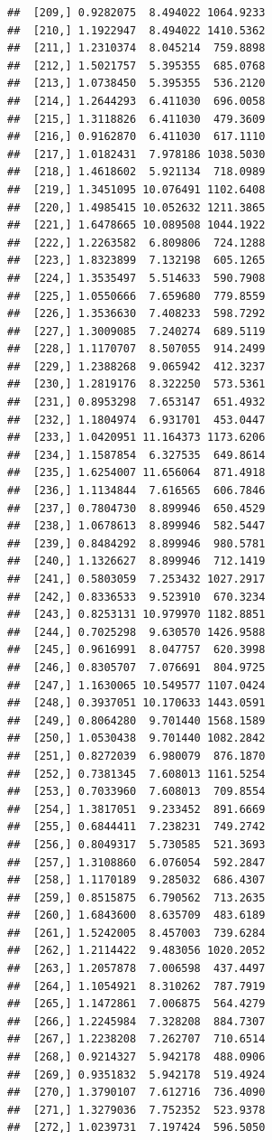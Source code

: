 \documentclass[article]{jss}\usepackage[]{graphicx}\usepackage[]{xcolor}
\makeatletter
\newenvironment{kframe}{%
 \def\at@end@of@kframe{}%
 \ifinner\ifhmode%
  \def\at@end@of@kframe{\end{minipage}}%
  \begin{minipage}{\columnwidth}%
 \fi\fi%
 \def\FrameCommand##1{\hskip\@totalleftmargin \hskip-\fboxsep
 \colorbox{shadecolor}{##1}\hskip-\fboxsep
     \hskip-\linewidth \hskip-\@totalleftmargin \hskip\columnwidth}%
 \MakeFramed {\advance\hsize-\width
   \@totalleftmargin\z@ \linewidth\hsize
   \@setminipage}}%
 {\par\unskip\endMakeFramed%
 \at@end@of@kframe}
\newenvironment{knitrout}{}{} %
\makeatother
\begin{document}
\begin{knitrout}
\begin{kframe}
\begin{verbatim}
##  [209,] 0.9282075  8.494022 1064.9233
##  [210,] 1.1922947  8.494022 1410.5362
##  [211,] 1.2310374  8.045214  759.8898
##  [212,] 1.5021757  5.395355  685.0768
##  [213,] 1.0738450  5.395355  536.2120
##  [214,] 1.2644293  6.411030  696.0058
##  [215,] 1.3118826  6.411030  479.3609
##  [216,] 0.9162870  6.411030  617.1110
##  [217,] 1.0182431  7.978186 1038.5030
##  [218,] 1.4618602  5.921134  718.0989
##  [219,] 1.3451095 10.076491 1102.6408
##  [220,] 1.4985415 10.052632 1211.3865
##  [221,] 1.6478665 10.089508 1044.1922
##  [222,] 1.2263582  6.809806  724.1288
##  [223,] 1.8323899  7.132198  605.1265
##  [224,] 1.3535497  5.514633  590.7908
##  [225,] 1.0550666  7.659680  779.8559
##  [226,] 1.3536630  7.408233  598.7292
##  [227,] 1.3009085  7.240274  689.5119
##  [228,] 1.1170707  8.507055  914.2499
##  [229,] 1.2388268  9.065942  412.3237
##  [230,] 1.2819176  8.322250  573.5361
##  [231,] 0.8953298  7.653147  651.4932
##  [232,] 1.1804974  6.931701  453.0447
##  [233,] 1.0420951 11.164373 1173.6206
##  [234,] 1.1587854  6.327535  649.8614
##  [235,] 1.6254007 11.656064  871.4918
##  [236,] 1.1134844  7.616565  606.7846
##  [237,] 0.7804730  8.899946  650.4529
##  [238,] 1.0678613  8.899946  582.5447
##  [239,] 0.8484292  8.899946  980.5781
##  [240,] 1.1326627  8.899946  712.1419
##  [241,] 0.5803059  7.253432 1027.2917
##  [242,] 0.8336533  9.523910  670.3234
##  [243,] 0.8253131 10.979970 1182.8851
##  [244,] 0.7025298  9.630570 1426.9588
##  [245,] 0.9616991  8.047757  620.3998
##  [246,] 0.8305707  7.076691  804.9725
##  [247,] 1.1630065 10.549577 1107.0424
##  [248,] 0.3937051 10.170633 1443.0591
##  [249,] 0.8064280  9.701440 1568.1589
##  [250,] 1.0530438  9.701440 1082.2842
##  [251,] 0.8272039  6.980079  876.1870
##  [252,] 0.7381345  7.608013 1161.5254
##  [253,] 0.7033960  7.608013  709.8554
##  [254,] 1.3817051  9.233452  891.6669
##  [255,] 0.6844411  7.238231  749.2742
##  [256,] 0.8049317  5.730585  521.3693
##  [257,] 1.3108860  6.076054  592.2847
##  [258,] 1.1170189  9.285032  686.4307
##  [259,] 0.8515875  6.790562  713.2635
##  [260,] 1.6843600  8.635709  483.6189
##  [261,] 1.5242005  8.457003  739.6284
##  [262,] 1.2114422  9.483056 1020.2052
##  [263,] 1.2057878  7.006598  437.4497
##  [264,] 1.1054921  8.310262  787.7919
##  [265,] 1.1472861  7.006875  564.4279
##  [266,] 1.2245984  7.328208  884.7307
##  [267,] 1.2238208  7.262707  710.6514
##  [268,] 0.9214327  5.942178  488.0906
##  [269,] 0.9351832  5.942178  519.4924
##  [270,] 1.3790107  7.612716  736.4090
##  [271,] 1.3279036  7.752352  523.9378
##  [272,] 1.0239731  7.197424  596.5050

\end{verbatim}
\end{kframe}
\end{knitrout}
\end{document}
